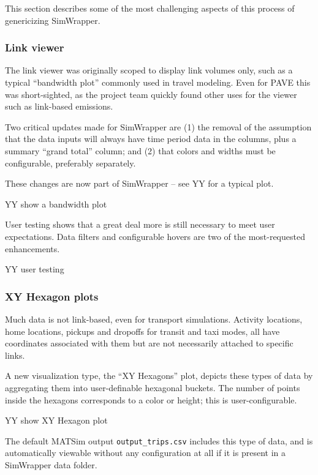 This section describes some of the most challenging aspects of this
process of genericizing SimWrapper.

\hypertarget{link-viewer}{%
\subsubsection{Link viewer}\label{link-viewer}}

The link viewer was originally scoped to display link volumes only, such
as a typical ``bandwidth plot'' commonly used in travel modeling. Even
for PAVE this was short-sighted, as the project team quickly found other
uses for the viewer such as link-based emissions.

Two critical updates made for SimWrapper are (1) the removal of the
assumption that the data inputs will always have time period data in the
columns, plus a summary ``grand total'' column; and (2) that colors and
widths must be configurable, preferably separately.

These changes are now part of SimWrapper -- see YY for a typical plot.

YY show a bandwidth plot

User testing shows that a great deal more is still necessary to meet
user expectations. Data filters and configurable hovers are two of the
most-requested enhancements.

YY user testing

\hypertarget{xy-hexagon-plots}{%
\subsubsection{XY Hexagon plots}\label{xy-hexagon-plots}}

Much data is not link-based, even for transport simulations. Activity
locations, home locations, pickups and dropoffs for transit and taxi
modes, all have coordinates associated with them but are not necessarily
attached to specific links.

A new visualization type, the ``XY Hexagons'' plot, depicts these types
of data by aggregating them into user-definable hexagonal buckets. The
number of points inside the hexagons corresponds to a color or height;
this is user-configurable.

YY show XY Hexagon plot

The default MATSim output \texttt{output\_trips.csv} includes this type
of data, and is automatically viewable without any configuration at all
if it is present in a SimWrapper data folder.

